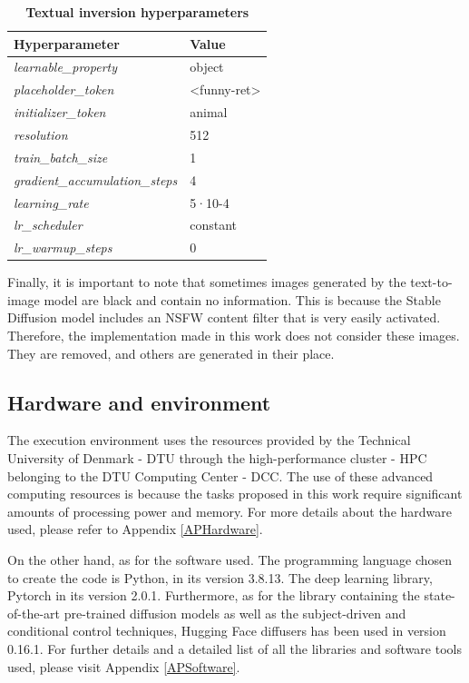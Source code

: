 \begin{table}[ht]
\centering
\begin{tabular}{|l|l|}
\hline
\rowcolor[HTML]{AEAAAA} 
\textbf{Hyperparameter} & \textbf{Value} \\ \hline
\textit{learnable\_property} & object \\ \hline
\textit{placeholder\_token} & \textless{}funny-ret\textgreater{} \\ \hline
\textit{initializer\_token} & animal \\ \hline
\textit{resolution} & 512 \\ \hline
\textit{train\_batch\_size} & 1 \\ \hline
\textit{gradient\_accumulation\_steps} & 4 \\ \hline
\textit{learning\_rate} & 5·10-4 \\ \hline
\textit{lr\_scheduler} & constant \\ \hline
\textit{lr\_warmup\_steps} & 0 \\ \hline
\end{tabular}
\caption{\textbf{Textual inversion hyperparameters}}
\label{table:TableTextinversionhyperparameters}
\end{table}

Finally, it is important to note that sometimes images generated by the text-to-image model are black and contain no information. This is because the Stable Diffusion model includes an NSFW content filter that is very easily activated. Therefore, the implementation made in this work does not consider these images. They are removed, and others are generated in their place.

\subsection{Hardware and environment}

The execution environment uses the resources provided by the Technical University of Denmark - DTU through the high-performance cluster - HPC belonging to the DTU Computing Center - DCC. The use of these advanced computing resources is because the tasks proposed in this work require significant amounts of processing power and memory. For more details about the hardware used, please refer to Appendix \ref{APHardware}. 

On the other hand, as for the software used. The programming language chosen to create the code is Python, in its version 3.8.13. The deep learning library, Pytorch in its version 2.0.1. Furthermore, as for the library containing the state-of-the-art pre-trained diffusion models as well as the subject-driven and conditional control techniques, Hugging Face diffusers has been used in version 0.16.1. For further details and a detailed list of all the libraries and software tools used, please visit Appendix \ref{APSoftware}.


